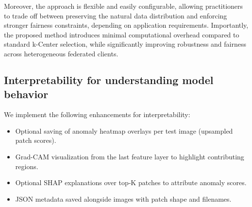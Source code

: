 \documentclass{article}
\begin{document}
Moreover, the approach is flexible and easily configurable, allowing practitioners to trade off between preserving the natural data distribution and enforcing stronger fairness constraints, depending on application requirements. Importantly, the proposed method introduces minimal computational overhead compared to standard k-Center selection, while significantly improving robustness and fairness across heterogeneous federated clients.

\FloatBarrier

\subsection{Interpretability for understanding model behavior}

We implement the following enhancements for interpretability:
\begin{itemize}
	\item Optional saving of anomaly heatmap overlays per test image (upsampled patch scores).
  	\item Grad-CAM visualization from the last feature layer to highlight contributing regions. \cite{Selvaraju_2019}
	\item Optional SHAP explanations over top‑K patches to attribute anomaly scores. \cite{lundberg2017unifiedapproachinterpretingmodel}
	\item JSON metadata saved alongside images with patch shape and filenames.
\end{itemize}
\end{document}
